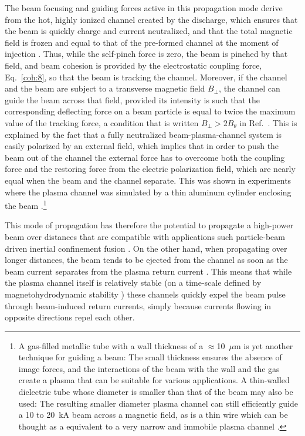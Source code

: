 \documentclass [12pt,a4paper,     ]{report} %
\begin{document}
   The beam focusing and guiding forces active in this propagation mode derive from the hot, highly ionized channel created by the discharge, which ensures that the beam is quickly charge and current neutralized, and that the total magnetic field is frozen and equal to that of the pre-formed channel at the moment of injection \cite{MILLE1977-, OTTIN1979-}.  Thus, while the self-pinch force is zero, the beam is pinched by that field, and beam cohesion is provided by the electrostatic coupling force, Eq.~\eqref{coh:8}, so that the beam is tracking the channel.  Moreover, if the channel and the beam are subject to a transverse magnetic field $B_{\perp}$, the channel can guide the beam across that field, provided its intensity is such that the corresponding deflecting force on a beam particle is equal to twice the maximum value of the tracking force, a condition that is written $B_{\perp} > 2 B_{\theta}$ in Ref.~\cite{RUDAK1973-}.  This is explained by the fact that a fully neutralized beam-plasma-channel system is easily polarized by an external field, which implies that in order to push the beam out of the channel the external force has to overcome both the coupling force and the restoring force from the electric polarization field, which are nearly equal when the beam and the channel separate.  This was shown in experiments where the plasma channel was simulated by a thin aluminum cylinder enclosing the beam \cite{RUDAK1973-, BARAN1976-}.\footnote{A gas-filled metallic tube with a wall thickness of a $\approx$10~$\mu$m is yet another technique for guiding a beam: The small thickness ensures the absence of image forces, and the interactions of the beam with the wall and the gas create a plasma that can be suitable for various applications. A thin-walled dielectric tube whose diameter is smaller than that of the beam may also be used:  The resulting smaller diameter plasma channel can still efficiently guide a 10 to 20~kA beam across a magnetic field, as is a thin wire which can be thought as a equivalent to a very narrow and immobile plasma channel \cite{DIDEN1977-,PRONO1983-}.}


   This mode of propagation has therefore the potential to propagate a high-power beam over distances that are compatible with applications such particle-beam driven inertial confinement fusion \cite{MILLE1977-, OTTIN1979-,OLSON2001-}.  On the other hand, when propagating over longer distances, the beam tends to be ejected from the channel as soon as the beam current separates from the plasma return current \cite{DIDEN1977-,OTTIN1979-, MURPH1987-}.  This means that while the plasma channel itself is relatively stable (on a time-scale defined by magnetohydrodynamic stability \cite{MANHE1973-, OLSEN1982-}) these channels quickly expel the beam pulse through beam-induced return currents, simply because currents flowing in opposite directions repel each other.
\end{document}
